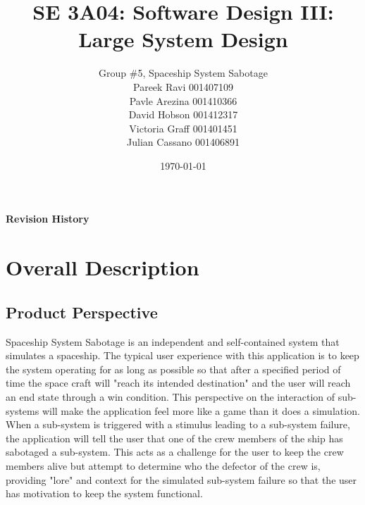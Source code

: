 \documentclass[12pt, titlepage]{article}
\title{SE 3A04: Software Design III: Large System Design}
\author{Group \#5, Spaceship System Sabotage %
		\\Pareek Ravi 001407109
		\\Pavle Arezina 001410366
		\\David Hobson 001412317
		\\Victoria Graff 001401451
		\\Julian Cassano 001406891
}
\date{\today}
\begin{document}
\maketitle
{}
\tableofcontents
\listoftables
\listoffigures
\begin{table}[bp]
\caption{\bf Revision History}
\end{table}
\newpage
{}

\section{Overall Description}
\subsection{Product Perspective}
Spaceship System Sabotage is an independent and self-contained system that simulates a spaceship. The typical user experience with this application is to keep the system operating for as long as possible so that after a specified period of time the space craft will "reach its intended destination" and the user will reach an end state through a win condition. This perspective on the interaction of sub-systems will make the application feel more like a game than it does a simulation. When a sub-system is triggered with a stimulus leading to a sub-system failure, the application will tell the user that one of the crew members of the ship has sabotaged a sub-system. This acts as a challenge for the user to keep the crew members alive but attempt to determine who the defector of the crew is, providing "lore" and context for the simulated sub-system failure so that the user has motivation to keep the system functional.
\end{document}

